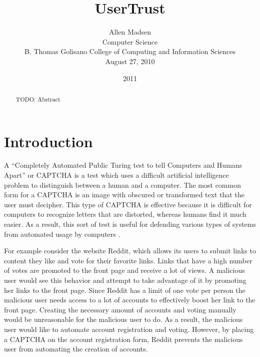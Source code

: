 \documentclass[journal, 12pt, onecolumn, draftclsnofoot]{IEEEtran}
\begin{document}
\title{\Large\bf UserTrust}
\date{2011}
\author{Allen Madsen \\ Computer Science \\ B. Thomas Golisano College of Computing and Information Sciences \\ August 27, 2010
}
\maketitle
\thispagestyle{empty}

\newpage

\begin{abstract}

TODO: Abstract

\nocite{*}

\end{abstract}

\section{Introduction}
\label{Introduction}

A “Completely Automated Public Turing test to tell Computers and Humans Apart” or CAPTCHA is a test which uses a difficult artificial intelligence problem to distinguish between a human and a computer. The most common form for a CAPTCHA is an image with obscured or transformed text that the user must decipher. This type of CAPTCHA is effective because it is difficult for computers to recognize letters that are distorted, whereas humans find it much easier. As a result, this sort of test is useful for defending various types of systems from automated usage by computers \cite{vonahn}.

For example consider the website Reddit, which allows its users to submit links to content they like and vote for their favorite links. Links that have a high number of votes are promoted to the front page and receive a lot of views. A malicious user would see this behavior and attempt to take advantage of it by promoting her links to the front page. Since Reddit has a limit of one vote per person the malicious user needs access to a lot of accounts to effectively boost her link to the front page. Creating the necessary amount of accounts and voting manually would be unreasonable for the malicious user to do. As a result, the malicious user would like to automate account registration and voting. However, by placing a CAPTCHA on the account registration form, Reddit prevents the malicious user from automating the creation of accounts.
\end{document}
